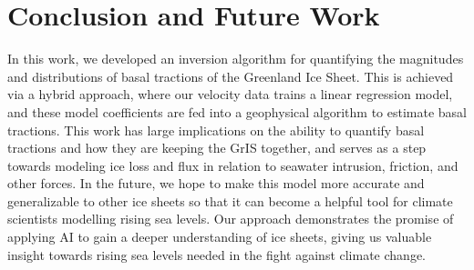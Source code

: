 \documentclass{article}
\begin{document}
\section{Conclusion and Future Work}

In this work, we developed an inversion algorithm for quantifying the magnitudes and distributions of basal tractions of the Greenland Ice Sheet. This is achieved via a hybrid approach, where our velocity data trains a linear regression model, and these model coefficients are fed into a geophysical algorithm to estimate basal tractions. This work has large implications on the ability to quantify basal tractions and how they are keeping the GrIS together, and serves as a step towards modeling ice loss and flux in relation to seawater intrusion, friction, and other forces. In the future, we hope to make this model more accurate and generalizable to other ice sheets so that it can become a helpful tool for climate scientists modelling rising sea levels. Our approach demonstrates the promise of applying AI to gain a deeper understanding of ice sheets, giving us valuable insight towards rising sea levels needed in the fight against climate change.



\end{document}
